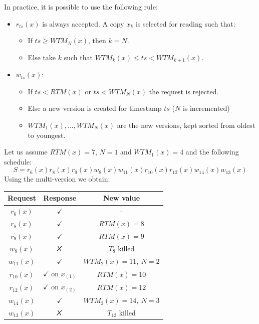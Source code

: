 \documentclass[12pt, a4paper]{report}
\newtheorem[style=M,bodystyle=\normalfont]{theorem}{Theorem}
\newtheorem[style=M,bodystyle=\normalfont]{corollary}{Corollary}
\newtheorem[style=M,bodystyle=\normalfont]{lemma}{Lemma}
\newtheorem[style=M,bodystyle=\normalfont]{definition}{Definition}
\newcommand{\tikzxmark}{%
\tikz[scale=0.23] {
    \draw[line width=0.7,line cap=round] (0,0) to [bend left=6] (1,1);
    \draw[line width=0.7,line cap=round] (0.2,0.95) to [bend right=3] (0.8,0.05);
}}
\begin{document}
    In practice, it is possible to use the following rule: 
    \begin{itemize}
        \item $r_{ts}(x)$ is always accepted. A copy $x_k$ is selected for reading such that:
            \begin{itemize}
                \item If $ts \geq WTM_N(x)$, then $k=N$. 
                \item Else take $k$ such that $WTM_k(x) \leq ts < WTM_{k+1}(x)$. 
            \end{itemize}
        \item $w_{ts}(x)$:
            \begin{itemize}
                \item If $ts < RTM(x)$ or $ts < WTM_N(x)$ the request is rejected. 
                \item Else a new version is created for timestamp $ts$ ($N$ is incremented)
                \item $WTM_1(x), \dots, WTM_N(x)$ are the new versions, kept sorted from oldest to youngest. 
            \end{itemize}
    \end{itemize}
    \begin{example}
        Let us assume $RTM(x)=7$, $N=1$ and $WTM_1(x)=4$ and the following schedule: 
        \[S=r_6(x) r_8(x) r_9(x) w_8(x) w_{11}(x) r_{10}(x) r_{12}(x) w_{14}(x) w_{13}(x)\]
        Using the multi-version we obtain: 
        \begin{table}[H]
            \centering
            \begin{tabular}{ccc}
            \textbf{Request} & \textbf{Response}         & \textbf{New value}  \\ \hline
            $r_6(x)$         & $\checkmark$              & -                   \\
            $r_8(x)$         & $\checkmark$              & $RTM(x)=8$          \\
            $r_9(x)$         & $\checkmark$              & $RTM(x)=9$          \\
            $w_8(x)$         & $\tikzxmark$              & $T_8$ killed        \\
            $w_{11}(x)$      & $\checkmark$              & $WTM_2(x)=11,\:N=2$ \\
            $r_{10}(x)$      & $\checkmark$ on $x_{(1)}$ & $RTM(x)=10$         \\
            $r_{12}(x)$      & $\checkmark$ on $x_{(2)}$ & $RTM(x)=12$         \\
            $w_{14}(x)$      & $\checkmark$              & $WTM_3(x)=14,\:N=3$ \\
            $w_{13}(x)$      & $\tikzxmark$              & $T_{13}$ killed
            \end{tabular}
        \end{table}
    \end{example}
\end{document}
